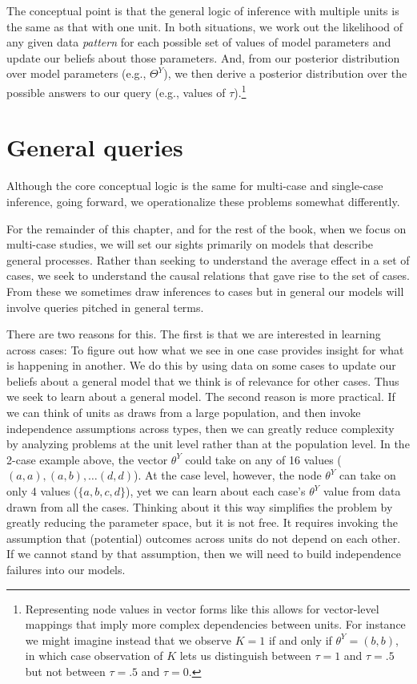 \documentclass[
  12pt,
]{book}
\begin{document}
The conceptual point is that the general logic of inference with multiple units is the same as that with one unit. In both situations, we work out the likelihood of any given data \emph{pattern} for each possible set of values of model parameters and update our beliefs about those parameters. And, from our posterior distribution over model parameters (e.g., \(\Theta^Y\)), we then derive a posterior distribution over the possible answers to our query (e.g., values of \(\tau\)).\footnote{Representing node values in vector forms like this allows for vector-level mappings that imply more complex dependencies between units. For instance we might imagine instead that we observe \(K=1\) if and only if \(\theta^Y = (b,b)\), in which case observation of \(K\) lets us distinguish between \(\tau = 1\) and \(\tau = .5\) but not between \(\tau = .5\) and \(\tau = 0\).}

\hypertarget{general-queries}{%
\section{General queries}\label{general-queries}}

Although the core conceptual logic is the same for multi-case and single-case inference, going forward, we operationalize these problems somewhat differently.

For the remainder of this chapter, and for the rest of the book, when we focus on multi-case studies, we will set our sights primarily on models that describe general processes. Rather than seeking to understand the average effect in a set of cases, we seek to understand the causal relations that gave rise to the set of cases. From these we sometimes draw inferences to cases but in general our models will involve queries pitched in general terms.

There are two reasons for this. The first is that we are interested in learning across cases: To figure out how what we see in one case provides insight for what is happening in another. We do this by using data on some cases to update our beliefs about a general model that we think is of relevance for other cases. Thus we seek to learn about a general model. The second reason is more practical. If we can think of units as draws from a large population, and then invoke independence assumptions across types, then we can greatly reduce complexity by analyzing problems at the unit level rather than at the population level. In the 2-case example above, the vector \(\theta^Y\) could take on any of 16 values (\((a,a), (a,b),\dots (d,d)\)). At the case level, however, the node \(\theta^Y\) can take on only 4 values (\(\{a,b,c,d\}\)), yet we can learn about each case's \(\theta^Y\) value from data drawn from all the cases. Thinking about it this way simplifies the problem by greatly reducing the parameter space, but it is not free. It requires invoking the assumption that (potential) outcomes across units do not depend on each other. If we cannot stand by that assumption, then we will need to build independence failures into our models.
\end{document}
